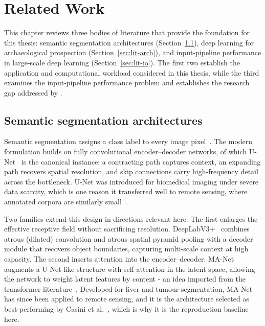 \section{Related Work}
\label{ch:literature}
This chapter reviews three bodies of literature that provide the foundation for this thesis: semantic segmentation architectures (Section~\ref{sec:lit-seg}), deep learning for archaeological prospection (Section~\ref{sec:lit-arch}), and input-pipeline performance in large-scale deep learning (Section~\ref{sec:lit-io}). The first two establish the application and computational workload considered in this thesis, while the third examines the input-pipeline performance problem and establishes the research gap addressed by \pads{}.


\subsection{Semantic segmentation architectures}
\label{sec:lit-seg}

Semantic segmentation assigns a class label to every image pixel~\cite{Ronneberger15,Chen18}.
The modern formulation builds on fully convolutional encoder--decoder networks,
of which U-Net~\cite{Ronneberger15} is the canonical instance: a contracting path
captures context, an expanding path recovers spatial resolution, and skip
connections carry high-frequency detail across the bottleneck.
U-Net was introduced for biomedical imaging under severe data scarcity, which is
one reason it transferred well to remote sensing, where annotated corpora are
similarly small~\cite{Ronneberger15,Casini23}.

Two families extend this design in directions relevant here.
The first enlarges the effective receptive field without sacrificing resolution.
DeepLabV3+~\cite{Chen18} combines atrous (dilated) convolution and atrous spatial
pyramid pooling with a decoder module that recovers object boundaries, capturing
multi-scale context at high capacity.
The second inserts attention into the encoder--decoder.
MA-Net~\cite{Fan20} augments a U-Net-like structure with self-attention in the
latent space, allowing the network to weight latent features by content - an idea
imported from the transformer literature~\cite{Vaswani17}.
Developed for liver and tumour segmentation, MA-Net has since been applied to
remote sensing, and it is the architecture selected as best-performing by
Casini et al.~\cite{Casini23}, which is why it is the reproduction baseline here.

